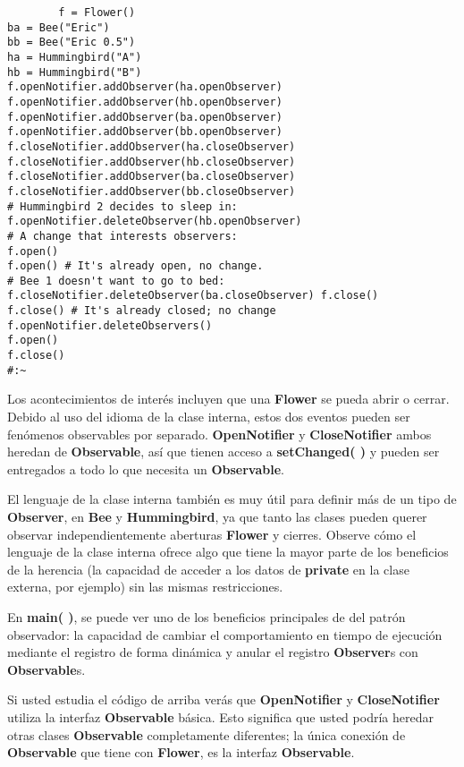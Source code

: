 \begin{lstlisting}
        f = Flower() 
ba = Bee("Eric") 
bb = Bee("Eric 0.5") 
ha = Hummingbird("A") 
hb = Hummingbird("B") 
f.openNotifier.addObserver(ha.openObserver) 
f.openNotifier.addObserver(hb.openObserver) 
f.openNotifier.addObserver(ba.openObserver) 
f.openNotifier.addObserver(bb.openObserver) 
f.closeNotifier.addObserver(ha.closeObserver) 
f.closeNotifier.addObserver(hb.closeObserver) 
f.closeNotifier.addObserver(ba.closeObserver) 
f.closeNotifier.addObserver(bb.closeObserver) 
# Hummingbird 2 decides to sleep in: 
f.openNotifier.deleteObserver(hb.openObserver) 
# A change that interests observers: 
f.open() 
f.open() # It's already open, no change. 
# Bee 1 doesn't want to go to bed: 
f.closeNotifier.deleteObserver(ba.closeObserver) f.close() 
f.close() # It's already closed; no change 
f.openNotifier.deleteObservers() 
f.open() 
f.close() 
#:~ 
\end{lstlisting}

Los acontecimientos de interés incluyen que una \textbf{Flower} se pueda abrir o cerrar. Debido al uso del idioma de la clase interna, estos dos eventos pueden ser fenómenos observables por separado. \textbf{OpenNotifier} y \textbf{CloseNotifier} ambos heredan de \textbf{Observable}, así que tienen acceso a \textbf{setChanged( )} y pueden ser entregados a todo lo que necesita un \textbf{Observable}. \newline

El lenguaje de la clase interna también es muy útil para definir más de un tipo de \textbf{Observer}, en \textbf{Bee} y \textbf{Hummingbird}, ya que tanto las clases pueden querer observar independientemente aberturas \textbf{Flower} y cierres. Observe cómo el lenguaje de la clase interna ofrece algo que tiene la mayor parte de los beneficios de la herencia (la capacidad de acceder a los datos de \textbf{private} en la clase externa, por ejemplo) sin las mismas restricciones.  \newline

En \textbf{main( )}, se puede ver uno de los beneficios principales de del patrón observador: la capacidad de cambiar el comportamiento en tiempo de ejecución mediante el registro de forma dinámica y anular el registro \textbf{Observer}s con \textbf{Observable}s.    \newline

Si usted estudia el código de arriba verás que \textbf{OpenNotifier} y \textbf{CloseNotifier} utiliza la interfaz \textbf{Observable} básica. Esto significa que usted podría heredar otras clases \textbf{Observable} completamente diferentes; la única conexión de \textbf{Observable} que tiene con \textbf{Flower}, es la interfaz \textbf{Observable}.    \newline

